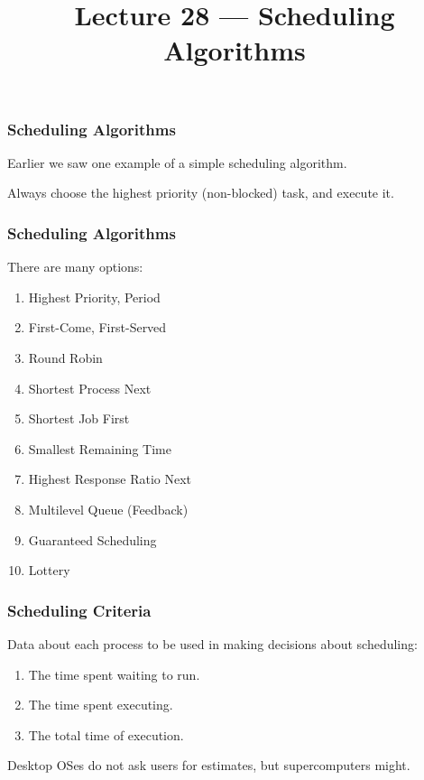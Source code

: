 

\newlength{\slidewidth}
\setlength{\slidewidth}{0.8\textwidth}

\title{Lecture 28 --- Scheduling Algorithms}





\begin{frame}
  \titlepage

 \end{frame}



\begin{frame}
\frametitle{Scheduling Algorithms}

Earlier we saw one example of a simple scheduling algorithm. 

Always choose the highest priority (non-blocked) task, and execute it. 

 \end{frame}



\begin{frame}
\frametitle{Scheduling Algorithms}


There are many options:
\begin{enumerate}
	\item Highest Priority, Period
	\item First-Come, First-Served
	\item Round Robin
	\item Shortest Process Next
	\item Shortest Job First
	\item Smallest Remaining Time
	\item Highest Response Ratio Next
	\item Multilevel Queue (Feedback)
	\item Guaranteed Scheduling
	\item Lottery
\end{enumerate}


\end{frame}

\begin{frame}
\frametitle{Scheduling Criteria}

Data about each process to be used in making decisions about scheduling:

\begin{enumerate}
	\item The time spent waiting to run.
	\item The time spent executing.
	\item The total time of execution.
\end{enumerate}

Desktop OSes do not ask users for estimates, but supercomputers might.

\end{frame}


